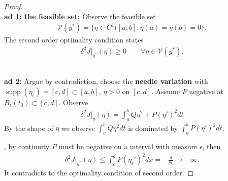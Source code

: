 \documentclass[a4paper,11pt,fleqn]{book}
\theoremstyle{definition}
\theoremstyle{remark}
\DeclareMathOperator*{\supp}{supp}
\begin{document}
\begin{proof}
\quad\\
\textbf{ad 1: the feasible set:}
Observe the feasible set 
\begin{align*}
	\mathcal{V}(y^*) = \{ \eta \in C^1([a, b]: \eta(a) = \eta(b) = 0\}.
\end{align*}
The second order optimality condition states
\begin{align*}
	\delta^2 J|_{y^*} (\eta) \ge 0 \qquad \forall \eta \in \mathcal{V}(y^*). 
\end{align*}
	
\quad\\
\textbf{ad 2:}
Argue by contradiction, choose the \textbf{needle variation} with $\supp(\eta_\epsilon) = [c, d] \subset [a, b]$, $\eta > 0$ on $[c, d]$. Assume $P$ negative at $B_\epsilon(t_0) \subset [c, d]$. Observe 
\begin{align*}
	\delta^2 J|_y(\eta) = \int_a^b Q \eta^2 + P (\eta')^2 dt
\end{align*}
By the shape of $\eta$ we observe $\int_a^b Q \eta^2 dt$ is dominated by $\int_a^b P (\eta')^2 dt$. \par 
	, by continuity $P$ must be negative on a interval with measure $\epsilon$, then 
\begin{align*}
	\delta^2 J|_{y^*}(\eta) \le  \int_c^d P (\eta_\epsilon ')^2 dx 
		= - \frac{\delta}{8 \epsilon}  \longrightarrow -\infty.
\end{align*}
	It contradicts to the optimality condition of second order. 
\end{proof}
\end{document}
